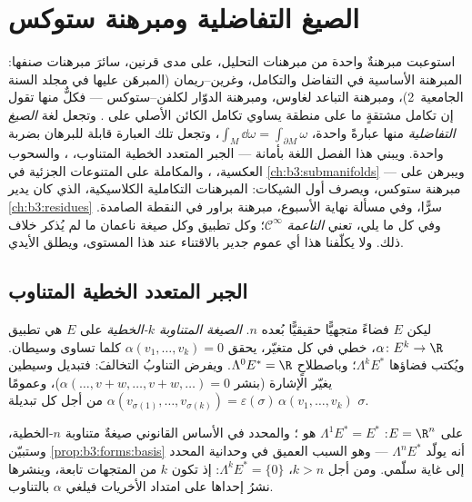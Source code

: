 \chapter{الصيغ التفاضلية ومبرهنة ستوكس}\label{ch:b3:forms}

استوعبت مبرهنةٌ واحدة من مبرهنات التحليل، على مدى قرنين، سائرَ
مبرهنات صنفها: المبرهنة الأساسية في التفاضل والتكامل،
وغرين--ريمان (المبرهَن عليها في مجلد السنة الجامعية~2)، ومبرهنة
التباعد لغاوس، ومبرهنة الدوّار لكلفن--ستوكس --- فكلٌّ منها تقول
إن تكامل مشتقةٍ ما على منطقة يساوي تكامل الكائن الأصلي على
. وتجعل لغة \emph{الصيغ التفاضلية} منها عبارةً واحدة،
$\int_M\dd\omega = \int_{\partial M}\omega$، وتجعل تلك العبارة قابلة للبرهان بضربة واحدة. ويبني هذا
الفصل اللغة بأمانة --- الجبر المتعدد الخطية المتناوب، ، والسحوب العكسية، ، والمكاملة على المتنوعات
الجزئية في \cref{ch:b3:submanifolds} --- ويبرهن على مبرهنة ستوكس، ويصرف أول
الشيكات: المبرهنات التكاملية الكلاسيكية،  الذي كان
يدير \cref{ch:b3:residues} سرًّا، وفي مسألة نهاية الأسبوع، مبرهنة براور في
النقطة الصامدة. وفي كل ما يلي، تعني \emph{الناعمة} $\mathcal
C^\infty$؛ وكل
تطبيق وكل صيغة ناعمان ما لم يُذكر خلاف ذلك. ولا يكلّفنا هذا أي
عموم جدير بالاقتناء عند هذا المستوى، ويطلق الأيدي.

\section{الجبر المتعدد الخطية المتناوب}

\begin{definition}\label{def:b3:forms:alternating}
ليكن $E$ فضاءً متجهيًّا حقيقيًّا بُعده $n$. \emph{الصيغة
المتناوبة $k$-الخطية} على $E$ هي تطبيق
$\alpha\colon E^k \to \R$، خطي في كل متغيّر، يحقق $\alpha(v_1, \dots, v_k) = 0$ كلما تساوى وسيطان. ويُكتب
فضاؤها $\Lambda^k E^*$؛ وباصطلاحٍ $\Lambda^0E^* = \R$. ويفرض التناوبُ
التخالفَ: فتبديل وسيطين يغيّر الإشارة (بنشر $\alpha(\dots, v + w, \dots, v + w, \dots) = 0$)، وعمومًا
$\alpha(v_{\sigma(1)}, \dots, v_{\sigma(k)}) =
\varepsilon(\sigma)\,\alpha(v_1, \dots, v_k)$ من أجل كل تبديلة $\sigma$.
\end{definition}

\begin{example}
على $E = \R^n$: $\Lambda^1E^* = E^*$ هو ؛ والمحدد في الأساس
القانوني صيغةٌ متناوبة $n$-الخطية، وستبيّن \cref{prop:b3:forms:basis} أنه
يولّد $\Lambda^nE^*$ --- وهو السبب العميق في وحدانية المحدد إلى
غاية سلّمي. ومن أجل $k > n$، $\Lambda^kE^* = \{0\}$: إذ تكون $k$ من المتجهات
تابعة، وينشرها نشرُ إحداها على امتداد الأخريات فيلغي $\alpha$
بالتناوب.
\end{example}

